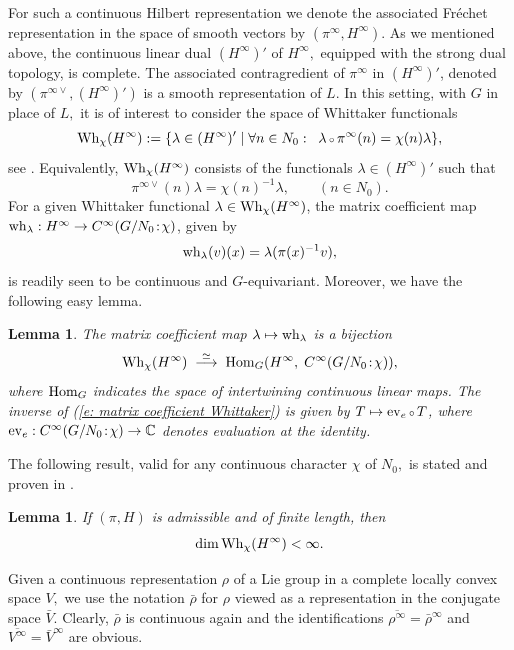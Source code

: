 \documentclass[12pt,a4paper]{article}
\newtheorem{Lemma}[Thm]{Lemma}
\newenvironment{lemma}[0]{\begin{Lemma}\noindent}%
{\end{Lemma}}
\def\qquad{\quad\quad}
\def\msy#1{{\mathbb #1}}
\def\C{{\msy C}}
\def\gl{\lambda}
\def\to{\rightarrow}
\def\Hom{{\rm Hom}}
\def\after{\,{\scriptstyle\circ}\,}
\numberwithin{Thm}{section}
\numberwithin{equation}{section}
\def\bN{N}
\def\bn{n}
\def\Wh{{\rm Wh}}
\def\ev{{\rm ev}}
\numberwithin{equation}{section}
\def\wh{{\rm wh}}
\def\col{\!:\!}
\def\cchi{\chi}
\def\veec{\vee}%
\begin{document}
For such a continuous Hilbert representation 
we denote the associated Fr\'echet representation in the space
of smooth vectors by $(\pi^\infty, H^\infty).$ As we mentioned above, 
the continuous linear dual $(H^\infty)'$ of $H^\infty,$ equipped with the strong 
dual topology, is complete. The associated  contragredient of $\pi^\infty$ in
$(H^\infty)'$, denoted by $(\pi^{\infty\veec}, (H^\infty)')$ is a smooth representation of
$L.$ 
In this setting, with $G$ in place of  $L,$ it is of interest to consider the space of Whittaker functionals
\begin{equation}
\label{e: defi space of Wh functionals}
\Wh_\cchi(H^\infty) := \{\gl \in (H^\infty)' \mid \forall \bn \in \bN_0:\;\;  \gl \after \pi^\infty(\bn) = \cchi(\bn)
\gl\},
\end{equation} 
see \cite[15.3.4, p.~378]{Wrrg2}.
Equivalently, $\Wh_\cchi(H^\infty)$ consists of the functionals 
$\gl \in (H^\infty)'$ such that 
$$ 
\pi^{\infty\veec}(n) \gl = \cchi(n)^{-1} \gl, \qquad (n \in N_0).
$$%
For a given Whittaker functional $\gl \in \Wh_\cchi(H^\infty)$, 
the matrix coefficient map $\wh_\gl: H^\infty \to C^\infty(G/N_0 \col \cchi)$, 
given by 
$$ 
\wh_\gl(v)(x) = \gl(\pi(x)^{-1} v),
$$%
is readily seen to be continuous and $G$-equivariant. Moreover, we
have the following easy lemma. 

\begin{lemma}
The matrix coefficient map $\gl \mapsto \wh_\gl$ is a bijection 
\begin{equation}
\label{e: matrix coefficient Whittaker}
\Wh_\cchi(H^\infty)\;\;
 {\buildrel \simeq \over \longrightarrow} \;\;\Hom_G(H^\infty, \; C^\infty(G/\bN_0\col \cchi)),
\end{equation}
where $\Hom_G$ indicates the space of intertwining continuous linear maps. 
The inverse of (\ref{e: matrix coefficient Whittaker}) 
is given by $T \mapsto \ev_e \after T$, where
$\ev_e: C^\infty(G/\bN_0\col \cchi) \to \C$ denotes evaluation at the identity.
\end{lemma}

The following result, valid for any continuous character $\chi$ of $N_0,$ is stated and proven in 
\cite[Cor 15.4.4]{Wrrg2}. 

\begin{lemma}
\label{l: finite dimensionality whit vectors}
If $(\pi, H)$ is admissible and of finite length, then 
$$ 
\dim \Wh_\chi(H^\infty) < \infty.
$$ 
\end{lemma}

Given a continuous representation $\rho$ of a Lie group in a complete locally convex space
$V,$ we use the notation $\bar\rho$ for $\rho$ viewed as a representation in 
the conjugate space $\bar V.$ Clearly, $\bar \rho$ is continuous again and the identifications
$\overline{\rho^\infty} = {\bar \rho}^\infty$ and $\overline{V^\infty} = \bar V^\infty$ are obvious.
\end{document}
